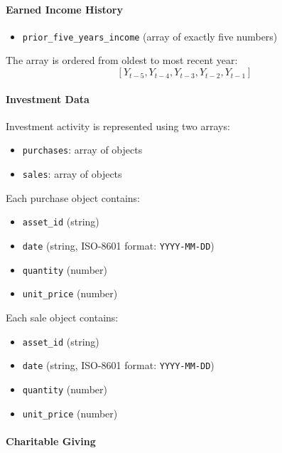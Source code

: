\paragraph{Earned Income History}

\begin{itemize}
  \item \texttt{prior\_five\_years\_income} (array of exactly five numbers)
\end{itemize}

The array is ordered from oldest to most recent year:
\[
[Y_{t-5}, Y_{t-4}, Y_{t-3}, Y_{t-2}, Y_{t-1}]
\]

\paragraph{Investment Data}

Investment activity is represented using two arrays:

\begin{itemize}
  \item \texttt{purchases}: array of objects
  \item \texttt{sales}: array of objects
\end{itemize}

Each purchase object contains:

\begin{itemize}
  \item \texttt{asset\_id} (string)
  \item \texttt{date} (string, ISO-8601 format: \texttt{YYYY-MM-DD})
  \item \texttt{quantity} (number)
  \item \texttt{unit\_price} (number)
\end{itemize}

Each sale object contains:

\begin{itemize}
  \item \texttt{asset\_id} (string)
  \item \texttt{date} (string, ISO-8601 format: \texttt{YYYY-MM-DD})
  \item \texttt{quantity} (number)
  \item \texttt{unit\_price} (number)
\end{itemize}

\paragraph{Charitable Giving}

